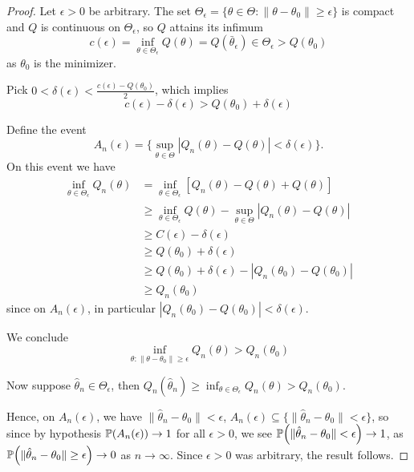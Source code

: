 \begin{proof}
  Let $\epsilon > 0$ be arbitrary. The set $\Theta_{\epsilon} = \{
  \theta \in \Theta : \| \theta - \theta_{0} \| \geq \epsilon \}$ is
  compact and $Q$ is continuous on $\Theta_{\epsilon}$, so $Q$ attains
  its infimum
  \begin{equation}
    \label{eq:33}
    c(\epsilon) = \inf_{\theta \in \Theta_{\epsilon}} Q(\theta) =
    Q(\bar \theta_{\epsilon}) \in \Theta_{\epsilon} > Q(\theta_{0})
  \end{equation} as $\theta_{0}$ is the minimizer.

  Pick $0 < \delta(\epsilon) < \frac{c(\epsilon) - Q(\theta_{0})}{2}$,
  which implies
  \begin{equation}
    \label{eq:34}
    c(\epsilon) - \delta(\epsilon) > Q(\theta_{0}) + \delta(\epsilon)
  \end{equation}

  Define the event
  \begin{equation}
    \label{eq:35}
    A_{n}(\epsilon) = \{ \sup_{\theta \in \Theta} |Q_{n}(\theta) -
    Q(\theta)| < \delta(\epsilon) \}.
  \end{equation}  On this event we have
  \begin{align*}
    \inf_{\theta \in \Theta_{\epsilon}} Q_{n}(\theta) & = \inf_{\theta
      \in \Theta_{\epsilon}} [Q_{n}(\theta) - Q(\theta) + Q(\theta)]
    \\
    & \geq \inf_{\theta \in \Theta_{\epsilon}} Q(\theta) - \sup_{\theta
      \in \Theta} |Q_{n}(\theta) - Q(\theta)|                                                 \\
    & \geq C(\epsilon) - \delta(\epsilon)   \\
    & \geq Q(\theta_{0}) + \delta(\epsilon) \\
    & \geq Q(\theta_{0}) + \delta(\epsilon) - |Q_{n}(\theta_{0}) -
    Q(\theta_{0})|                                                                            \\
    & \geq Q_{n}(\theta_{0})
  \end{align*} since on $A_{n}(\epsilon)$, in particular
  $|Q_{n}(\theta_{0}) - Q(\theta_{0})| < \delta(\epsilon)$.

  We conclude
  \begin{equation}
    \label{eq:36}
    \inf_{\theta: \|\theta - \theta_{0} \| \geq \epsilon}
    Q_{n}(\theta) > Q_{n}(\theta_{0})
  \end{equation}

  Now suppose $\hat \theta_{n} \in \Theta_{\epsilon}$, then
  $Q_{n}(\hat \theta_{n}) \geq \inf_{\theta \in \Theta_{\epsilon}}
  Q_{n}(\theta) > Q_{n}(\theta_{0})$.

  Hence, on $A_{n}(\epsilon)$, we have $\| \hat \theta_{n} -
  \theta_{0}\| < \epsilon$, $A_{n}(\epsilon) \subseteq \{ \| \hat
  \theta_{n} - \theta_{0} \| < \epsilon \}$, so since by hypothesis
  $\Prob{A_{n}(\epsilon)} \rightarrow 1$ for all $\epsilon > 0$, we
  see $\Prob{\| \hat \theta_{n} - \theta_{0} \| < \epsilon}
  \rightarrow 1$, as $\Prob{\| \hat \theta_{n} - \theta_{0} \| \geq
    \epsilon} \rightarrow 0$ as $n \rightarrow \infty$. Since
  $\epsilon > 0$ was arbitrary, the result follows.
\end{proof}

